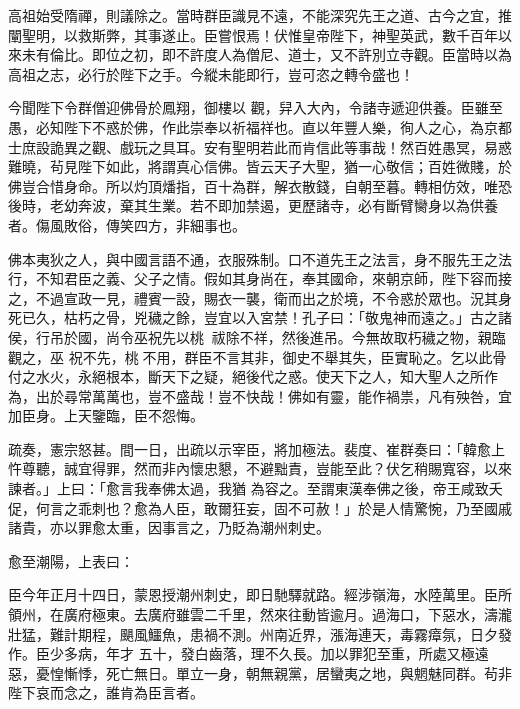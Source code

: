 \begin{pinyinscope}
 高祖始受隋禪，則議除之。當時群臣識見不遠，不能深究先王之道、古今之宜，推闡聖明，以救斯弊，其事遂止。臣嘗恨焉！伏惟皇帝陛下，神聖英武，數千百年以來未有倫比。即位之初，即不許度人為僧尼、道士，又不許別立寺觀。臣當時以為高祖之志，必行於陛下之手。今縱未能即行，豈可恣之轉令盛也！



 今聞陛下令群僧迎佛骨於鳳翔，御樓以
 觀，舁入大內，令諸寺遞迎供養。臣雖至愚，必知陛下不惑於佛，作此崇奉以祈福祥也。直以年豐人樂，徇人之心，為京都士庶設詭異之觀、戲玩之具耳。安有聖明若此而肯信此等事哉！然百姓愚冥，易惑難曉，茍見陛下如此，將謂真心信佛。皆云天子大聖，猶一心敬信；百姓微賤，於佛豈合惜身命。所以灼頂燔指，百十為群，解衣散錢，自朝至暮。轉相仿效，唯恐後時，老幼奔波，棄其生業。若不即加禁遏，更歷諸寺，必有斷臂臠身以為供養
 者。傷風敗俗，傳笑四方，非細事也。



 佛本夷狄之人，與中國言語不通，衣服殊制。口不道先王之法言，身不服先王之法行，不知君臣之義、父子之情。假如其身尚在，奉其國命，來朝京師，陛下容而接之，不過宣政一見，禮賓一設，賜衣一襲，衛而出之於境，不令惑於眾也。況其身死已久，枯朽之骨，兇穢之餘，豈宜以入宮禁！孔子曰：「敬鬼神而遠之。」古之諸侯，行吊於國，尚令巫祝先以桃，祓除不祥，然後進吊。今無故取朽穢之物，親臨觀之，巫
 祝不先，桃不用，群臣不言其非，御史不舉其失，臣實恥之。乞以此骨付之水火，永絕根本，斷天下之疑，絕後代之惑。使天下之人，知大聖人之所作為，出於尋常萬萬也，豈不盛哉！豈不快哉！佛如有靈，能作禍祟，凡有殃咎，宜加臣身。上天鑒臨，臣不怨悔。



 疏奏，憲宗怒甚。間一日，出疏以示宰臣，將加極法。裴度、崔群奏曰：「韓愈上忤尊聽，誠宜得罪，然而非內懷忠懇，不避黜責，豈能至此？伏乞稍賜寬容，以來諫者。」上曰：「愈言我奉佛太過，我猶
 為容之。至謂東漢奉佛之後，帝王咸致夭促，何言之乖刺也？愈為人臣，敢爾狂妄，固不可赦！」於是人情驚惋，乃至國戚諸貴，亦以罪愈太重，因事言之，乃貶為潮州刺史。



 愈至潮陽，上表曰：



 臣今年正月十四日，蒙恩授潮州刺史，即日馳驛就路。經涉嶺海，水陸萬里。臣所領州，在廣府極東。去廣府雖雲二千里，然來往動皆逾月。過海口，下惡水，濤瀧壯猛，難計期程，颶風鱷魚，患禍不測。州南近界，漲海連天，毒霧瘴氛，日夕發作。臣少多病，年才
 五十，發白齒落，理不久長。加以罪犯至重，所處又極遠惡，憂惶慚悸，死亡無日。單立一身，朝無親黨，居蠻夷之地，與魍魅同群。茍非陛下哀而念之，誰肯為臣言者。




\end{pinyinscope}
